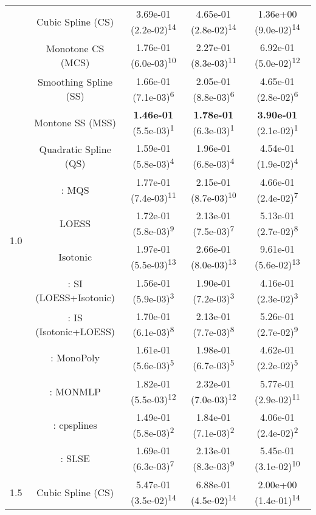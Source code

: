 \begin{tabular}{ccccc}
\midrule
\multirow{14}{*}{1.0}&Cubic Spline (CS)& 3.69e-01 (2.2e-02)\textsuperscript{14}& 4.65e-01 (2.8e-02)\textsuperscript{14}& 1.36e+00 (9.0e-02)\textsuperscript{14}\tabularnewline
&Monotone CS (MCS)& 1.76e-01 (6.0e-03)\textsuperscript{10}& 2.27e-01 (8.3e-03)\textsuperscript{11}& 6.92e-01 (5.0e-02)\textsuperscript{12}\tabularnewline
&Smoothing Spline (SS)& 1.66e-01 (7.1e-03)\textsuperscript{6}& 2.05e-01 (8.8e-03)\textsuperscript{6}& 4.65e-01 (2.8e-02)\textsuperscript{6}\tabularnewline
&Montone SS (MSS)& \textbf{1.46e-01} (5.5e-03)\textsuperscript{1}& \textbf{1.78e-01} (6.3e-03)\textsuperscript{1}& \textbf{3.90e-01} (2.1e-02)\textsuperscript{1}\tabularnewline
&Quadratic Spline (QS)& 1.59e-01 (5.8e-03)\textsuperscript{4}& 1.96e-01 (6.8e-03)\textsuperscript{4}& 4.54e-01 (1.9e-02)\textsuperscript{4}\tabularnewline
&\textcite{heMonotoneBsplineSmoothing1998}: MQS& 1.77e-01 (7.4e-03)\textsuperscript{11}& 2.15e-01 (8.7e-03)\textsuperscript{10}& 4.66e-01 (2.4e-02)\textsuperscript{7}\tabularnewline
&LOESS& 1.72e-01 (5.8e-03)\textsuperscript{9}& 2.13e-01 (7.5e-03)\textsuperscript{7}& 5.13e-01 (2.7e-02)\textsuperscript{8}\tabularnewline
&Isotonic& 1.97e-01 (5.5e-03)\textsuperscript{13}& 2.66e-01 (8.0e-03)\textsuperscript{13}& 9.61e-01 (5.6e-02)\textsuperscript{13}\tabularnewline
&\textcite{mammenEstimatingSmoothMonotone1991}: SI (LOESS+Isotonic)& 1.56e-01 (5.9e-03)\textsuperscript{3}& 1.90e-01 (7.2e-03)\textsuperscript{3}& 4.16e-01 (2.3e-02)\textsuperscript{3}\tabularnewline
&\textcite{mammenEstimatingSmoothMonotone1991}: IS (Isotonic+LOESS)& 1.70e-01 (6.1e-03)\textsuperscript{8}& 2.13e-01 (7.7e-03)\textsuperscript{8}& 5.26e-01 (2.7e-02)\textsuperscript{9}\tabularnewline
&\textcite{murrayFastFlexibleMethods2016a}: MonoPoly& 1.61e-01 (5.6e-03)\textsuperscript{5}& 1.98e-01 (6.7e-03)\textsuperscript{5}& 4.62e-01 (2.2e-02)\textsuperscript{5}\tabularnewline
&\textcite{cannonMonmlpMultilayerPerceptron2017}: MONMLP& 1.82e-01 (5.5e-03)\textsuperscript{12}& 2.32e-01 (7.0e-03)\textsuperscript{12}& 5.77e-01 (2.9e-02)\textsuperscript{11}\tabularnewline
&\textcite{navarro-garciaConstrainedSmoothingOutofrange2023}: cpsplines& 1.49e-01 (5.8e-03)\textsuperscript{2}& 1.84e-01 (7.1e-03)\textsuperscript{2}& 4.06e-01 (2.4e-02)\textsuperscript{2}\tabularnewline
&\textcite{groeneboomConfidenceIntervalsMonotone2023}: SLSE& 1.69e-01 (6.3e-03)\textsuperscript{7}& 2.13e-01 (8.3e-03)\textsuperscript{9}& 5.45e-01 (3.1e-02)\textsuperscript{10}\tabularnewline
\midrule
\multirow{14}{*}{1.5}&Cubic Spline (CS)& 5.47e-01 (3.5e-02)\textsuperscript{14}& 6.88e-01 (4.5e-02)\textsuperscript{14}& 2.00e+00 (1.4e-01)\textsuperscript{14}\tabularnewline

\end{tabular}
